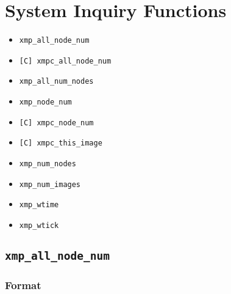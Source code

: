 %
%
%


\section{System Inquiry Functions}
\label{subsec:SystemInquiryFunctions}

\begin{itemize}
 \item {\tt xmp\_all\_node\_num}
 \item {\tt [C] xmpc\_all\_node\_num}
 \item {\tt xmp\_all\_num\_nodes}
 \item {\tt xmp\_node\_num}
 \item {\tt [C] xmpc\_node\_num}
 \item {\tt [C] xmpc\_this\_image}
 \item {\tt xmp\_num\_nodes}
 \item {\tt xmp\_num\_images}
 \item {\tt xmp\_wtime}
 \item {\tt xmp\_wtick}
\end{itemize}

\subsection{\tt xmp\_all\_node\_num}

\subsubsection*{Format}

